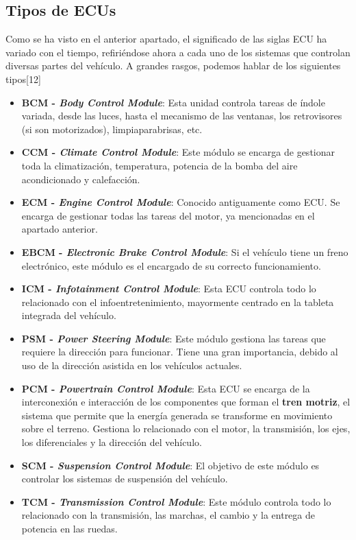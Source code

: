 \newpage


\subsection{Tipos de ECUs}
Como se ha visto en el anterior apartado, el significado de las siglas ECU ha variado con el tiempo, refiriéndose ahora a cada uno de los sistemas que controlan diversas partes del vehículo. A grandes rasgos, podemos hablar de los siguientes tipos[12]
\begin{itemize}
    \item \textbf{BCM - \textit{Body Control Module}}: Esta unidad controla tareas de índole variada, desde las luces, hasta el mecanismo de las ventanas, los retrovisores (si son motorizados), limpiaparabrisas, etc.
    \item \textbf{CCM - \textit{Climate Control Module}}: Este módulo se encarga de gestionar toda la climatización, temperatura, potencia de la bomba del aire acondicionado y calefacción.
    \item \textbf{ECM - \textit{Engine Control Module}}: Conocido antiguamente como ECU. Se encarga de gestionar todas las tareas del motor, ya mencionadas en el apartado anterior.
    \item \textbf{EBCM - \textit{Electronic Brake Control Module}}: Si el vehículo tiene un freno electrónico, este módulo es el encargado de su correcto funcionamiento.
    \item \textbf{ICM - \textit{Infotainment Control Module}}: Esta ECU controla todo lo relacionado con el infoentretenimiento, mayormente centrado en la tableta integrada del vehículo.
    \item \textbf{PSM - \textit{Power Steering Module}}: Este módulo gestiona las tareas que requiere la dirección para funcionar. Tiene una gran importancia, debido al uso de la dirección asistida en los vehículos actuales.
    \item \textbf{PCM - \textit{Powertrain Control Module}}: Esta ECU se encarga de la interconexión e interacción de los componentes que forman el \textbf{tren motriz}, el sistema que permite que la energía generada se transforme en movimiento sobre el terreno. Gestiona lo relacionado con el motor, la transmisión, los ejes, los diferenciales y la dirección del vehículo. 
    \item \textbf{SCM - \textit{Suspension Control Module}}: El objetivo de este módulo es controlar los sistemas de suspensión del vehículo.
    \item \textbf{TCM - \textit{Transmission Control Module}}: Este módulo controla todo lo relacionado con la transmisión, las marchas, el cambio y la entrega de potencia en las ruedas.
\end{itemize}
\newpage
